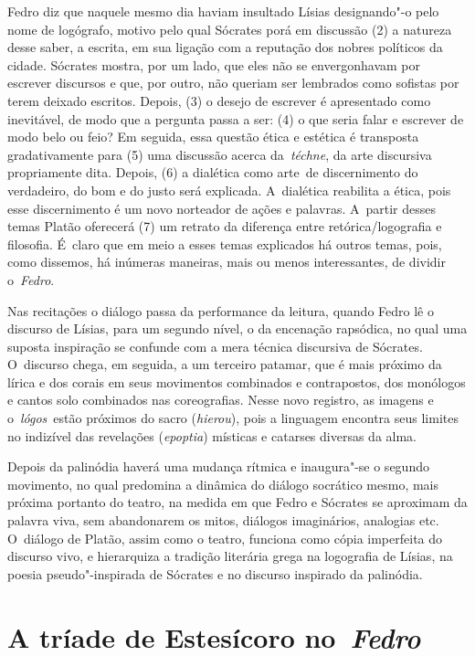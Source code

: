 Fedro diz que naquele mesmo dia haviam insultado Lísias designando"-o
pelo nome de logógrafo, motivo pelo qual Sócrates porá em discussão (2)
a natureza desse saber, a escrita, em sua ligação com a reputação dos
nobres políticos da cidade. Sócrates mostra, por um lado, que eles não
se envergonhavam por escrever discursos e que, por outro, não queriam
ser lembrados como sofistas por terem deixado escritos. Depois, (3) o
desejo de escrever é apresentado como inevitável, de modo que a pergunta
passa a ser: (4) o que seria falar e escrever de modo belo ou feio? Em
seguida, essa questão ética e estética é transposta gradativamente para
(5) uma discussão acerca da~\emph{téchne}, da arte discursiva
propriamente dita. Depois, (6) a dialética como arte\emph{~}de
discernimento do verdadeiro, do bom e do justo será explicada. A~dialética reabilita a ética, pois esse discernimento é um novo norteador
de ações e palavras. A~partir desses temas Platão oferecerá (7) um
retrato da diferença entre retórica/\allowbreak{}logografia e filosofia. É~claro que
em meio a esses temas explicados há outros temas, pois, como dissemos,
há inúmeras maneiras, mais ou menos interessantes, de dividir
o~\emph{Fedro}.

Nas recitações o diálogo passa da performance da leitura, quando Fedro
lê o discurso de Lísias, para um segundo nível, o da encenação
rapsódica, no qual uma suposta inspiração se confunde com a mera técnica
discursiva de Sócrates. O~discurso chega, em seguida, a um terceiro
patamar, que é mais próximo da lírica e dos corais em seus movimentos
combinados e contrapostos, dos monólogos e cantos solo combinados nas
coreografias. Nesse novo registro, as imagens e o~\emph{lógos}~estão
próximos do sacro (\emph{hierou}), pois a linguagem encontra seus
limites no indizível das revelações (\emph{epoptia}) místicas e catarses
diversas da alma.

Depois da palinódia haverá uma mudança rítmica e inaugura"-se o segundo
movimento, no qual predomina a dinâmica do diálogo socrático mesmo, mais
próxima portanto do teatro, na medida em que Fedro e Sócrates se
aproximam da palavra viva, sem abandonarem os mitos, diálogos
imaginários, analogias etc. O~diálogo de Platão, assim como o teatro,
funciona como cópia imperfeita do discurso vivo, e hierarquiza a
tradição literária grega na logografia de Lísias, na poesia
pseudo"-inspirada de Sócrates e no discurso inspirado da palinódia.

 

\section{A tríade de Estesícoro no~\emph{Fedro}}

